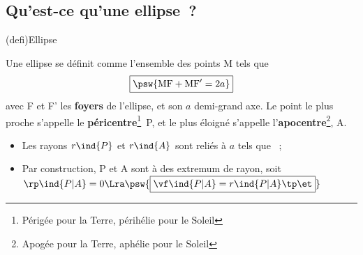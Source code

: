 \documentclass[../../main/main.tex]{subfiles}
\begin{document}
\subsection{Qu'est-ce qu'une ellipse~?}
\begin{tcb*}(defi){Ellipse}
	\begin{isd}[righthand ratio=.45]
		Une ellipse se définit comme l'ensemble des points M tels que
		\[\boxed{\psw{{\rm MF}+{\rm MF'} = 2a}}\]
		avec F et F' les \textbf{foyers} de l'ellipse, et son $a$ demi-grand axe.
		\smallbreak
		Le point le plus proche s'appelle le \textbf{péricentre}\footnote{Périgée
			pour la Terre, périhélie pour le Soleil}~P, et le plus éloigné
		s'appelle l'\textbf{apocentre}\footnote{Apogée pour la Terre, aphélie pour
			le Soleil}, A.
		\tcblower
		\begin{center}
		\end{center}
	\end{isd}
	\begin{itemize}
		\item Les rayons $r\ind{P}$ et $r\ind{A}$ sont reliés à $a$ tels que
		      ~;
		      \vspace{-10pt}
		\item Par construction, P et A sont à des extremum de rayon, soit
		      $\rp\ind{P|A} = 0 \Lra \psw{\boxed{\vf\ind{P|A} = r\ind{P|A}\tp \et}}$
	\end{itemize}
\end{tcb*}
\end{document}
